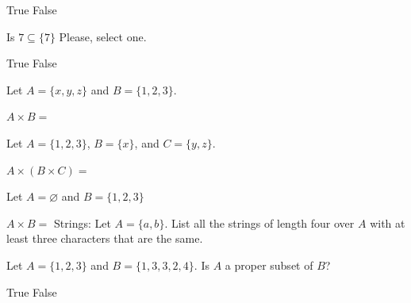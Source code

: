 \documentclass[letterpaper, 12pt]{exam}
\begin{document}
\begin{questions}
        \begin{checkboxes}
            \choice True
            \choice False
        \end{checkboxes}
        
        \question Is $7 \subseteq \{7\}$ Please, select one.

        \begin{checkboxes}
            \choice True
            \choice False
        \end{checkboxes}
        
        \question Let $A=\{x,y,z\}$ and $B=\{1,2,3\}$.

        $A \times B=$
        
        \question Let $A=\{1,2,3\}$, $B=\{x\}$, and $C=\{y,z\}$.

        $A \times (B \times C)=$
        
        \question Let $A=\varnothing$ and $B=\{1,2,3\}$

        $A \times B=$
        \question Strings: Let $A=\{a,b\}$. List all the strings of length four over $A$ with at least three characters that are the same.

        \question Let $A=\{1,2,3\}$ and $B=\{1,3,3,2,4\}$. Is $A$ a proper subset of $B$?

        \begin{checkboxes}
            \choice True
            \choice False
        \end{checkboxes}
    \end{questions}
\end{document}
